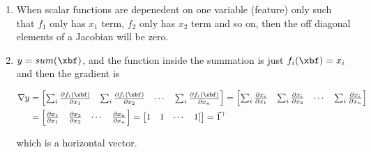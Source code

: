 \documentclass[12pt, xcolor=dvipsnames,svgnames,x11names]{article}
\begin{document}
\begin{enumerate}
\item When scalar functions are depenedent on one variable (feature) only such that $f_1$ only has $x_1$ term, $f_2$ only has $x_2$ term and so on, then the off diagonal elements of a Jacobian will be zero.

\item $ y = sum( \xbf)$, and the function inside the summation is just $f_i(\xbf) = x_i$ and then the gradient is 

\begin{align*}
\nabla y & = \begin{bmatrix}
\sum_i \pdv{f_i(\xbf)}{x_1} & \sum_i \pdv{f_i(\xbf)}{x_2} & \cdots & \sum_i \pdv{f_i(\xbf)}{x_n}
\end{bmatrix} =  \begin{bmatrix}
\sum_i \pdv{x_i}{x_1} & \sum_i \pdv{x_i}{x_2} & \cdots & \sum_i \pdv{x_i}{x_n}
\end{bmatrix}\\
& = \begin{bmatrix}
\pdv{x_1}{x_1} & \pdv{x_2}{x_2} & \cdots & \pdv{x_n}{x_n}
\end{bmatrix} = \begin{bmatrix}
1 & 1 & \cdots & 1] 
\end{bmatrix} = \vec{1}^\top
\end{align*}

which is a horizontal vector.

\end{enumerate}
\end{document}
